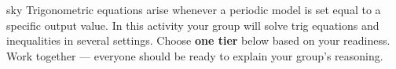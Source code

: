 \documentclass[10pt]{article}
\begin{document}
\namepartnerperiod

\vspace{0.08in}

\begin{scenariobox}{sky}
Trigonometric equations arise whenever a periodic model is set equal to
a specific output value. In this activity your group will solve trig
equations and inequalities in several settings. Choose \textbf{one tier}
below based on your readiness. Work together --- everyone should be ready
to explain your group's reasoning.
\end{scenariobox}

\vspace{0.08in}
\end{document}
